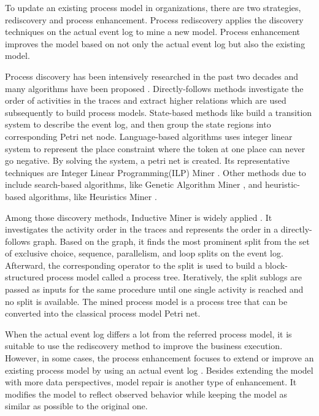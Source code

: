 To update an existing process model in organizations, there are two strategies, rediscovery and process enhancement. Process rediscovery applies the discovery techniques on the actual event log to mine a new model. Process enhancement improves the model based on not only the actual event log but also the existing model. 


Process discovery has been intensively researched in the past two decades and many algorithms have been proposed \cite{van2016data}. Directly-follows methods \cite{van2004workflow, leemans2013discovering} investigate the  order of activities in the traces and extract higher relations which are used subsequently to build process models. State-based methods like  \cite{bergenthum2007process, cortadella1995synthesizing}  build a transition system to describe the event log, and then group the state regions into corresponding Petri net node. Language-based algorithms uses integer linear system to represent the place constraint where the token at one place can never go negative. By solving the system, a petri net is created. Its representative techniques are Integer Linear Programming(ILP) Miner \cite{van2008process}. Other methods due to  \cite{van2009process} include search-based algorithms, like Genetic Algorithm Miner \cite{de2007genetic}, and heuristic-based algorithms, like Heuristics Miner \cite{weijters2003rediscovering}. 

Among those discovery methods, Inductive Miner is widely applied \cite{leemans2013discovering}. It investigates the activity order in the traces and represents the order in a directly-follows graph. Based on the graph, it finds the most prominent split from the set of exclusive choice, sequence, parallelism, and loop splits on the event log.  Afterward, the corresponding operator to the split is used to build a block-structured process model called a process tree. Iteratively, the  split sublogs are passed as inputs for the same procedure until one single activity is reached and no split is available. The mined process model is a process tree that can be converted into the classical process model Petri net. 


When the actual event log differs a lot from the referred process model, it is suitable to use the rediscovery method to improve the business execution. However, in some cases, the process enhancement focuses to extend or improve an existing process model by using an actual event log \cite{van2011process}. Besides extending the model with more data perspectives, model repair is another type of enhancement. It modifies the model to reflect observed behavior while keeping the model as similar as possible to the original one.

